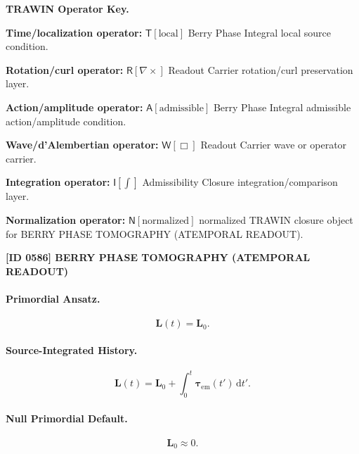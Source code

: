 \par\vspace{0.45\baselineskip}
\noindent\begin{minipage}[t]{\linewidth}
\begingroup
\small
\raggedright
\textbf{TRAWIN Operator Key.}\par
\noindent\textbf{Time/localization operator:} $\mathsf{T}\!\left[\mathrm{local}\right]$ Berry Phase Integral local source condition.\par
\noindent\textbf{Rotation/curl operator:} $\mathsf{R}\!\left[\nabla\times\right]$ Readout Carrier rotation/curl preservation layer.\par
\noindent\textbf{Action/amplitude operator:} $\mathsf{A}\!\left[\mathrm{admissible}\right]$ Berry Phase Integral admissible action/amplitude condition.\par
\noindent\textbf{Wave/d'Alembertian operator:} $\mathsf{W}\!\left[\Box\right]$ Readout Carrier wave or operator carrier.\par
\noindent\textbf{Integration operator:} $\mathsf{I}\!\left[\int\right]$ Admissibility Closure integration/comparison layer.\par
\noindent\textbf{Normalization operator:} $\mathsf{N}\!\left[\mathrm{normalized}\right]$ normalized TRAWIN closure object for BERRY PHASE TOMOGRAPHY (ATEMPORAL READOUT).\par
\endgroup
\end{minipage}

\clearpage
\noindent\textbf{[ID 0586] BERRY PHASE TOMOGRAPHY (ATEMPORAL READOUT)}\par
\vspace{0.35em}
\paragraph{Primordial Ansatz.}
\begin{equation}
\mathbf{L}(t)=\mathbf{L}_0 .
\end{equation}

\paragraph{Source-Integrated History.}
\begin{equation}
\mathbf{L}(t)
=
\mathbf{L}_0
+
\int_0^t
\boldsymbol{\tau}_{\mathrm{em}}(t')
\,\mathrm{d}t' .
\end{equation}

\paragraph{Null Primordial Default.}
\begin{equation}
\mathbf{L}_0\approx 0 .
\end{equation}

